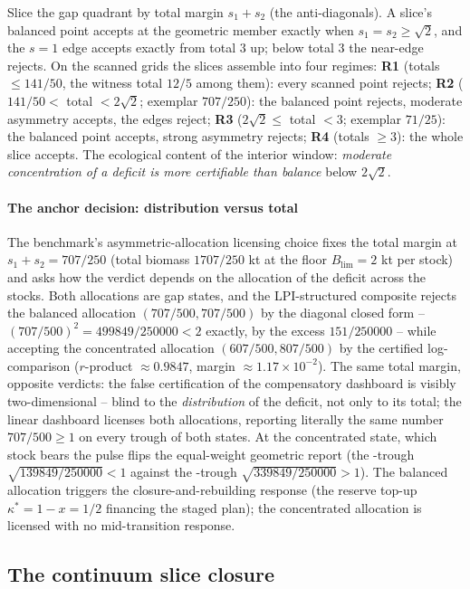 Slice the gap quadrant by total margin $s_1+s_2$ (the anti-diagonals). A slice's balanced point accepts at the geometric member exactly when $s_1=s_2\ge\sqrt2$, and the $s=1$ edge accepts exactly from total $3$ up; below total $3$ the near-edge rejects. On the scanned grids the slices assemble into four regimes: \textbf{R1} (totals $\le141/50$, the witness total $12/5$ among them): every scanned point rejects; \textbf{R2} ($141/50<$ total $<2\sqrt2$; exemplar $707/250$): the balanced point rejects, moderate asymmetry accepts, the edges reject; \textbf{R3} ($2\sqrt2\le$ total $<3$; exemplar $71/25$): the balanced point accepts, strong asymmetry rejects; \textbf{R4} (totals $\ge3$): the whole slice accepts. The ecological content of the interior window: \emph{moderate concentration of a deficit is more certifiable than balance} below $2\sqrt2$.

\paragraph{The anchor decision: distribution versus total} The benchmark's asymmetric-allocation licensing choice fixes the total margin at $s_1+s_2=707/250$ (total biomass $1707/250$ kt at the floor $B_{\mathrm{lim}}=2$ kt per stock) and asks how the verdict depends on the allocation of the deficit across the stocks. Both allocations are gap states, and the LPI-structured composite rejects the balanced allocation $(707/500,707/500)$ by the diagonal closed form -- $(707/500)^2=499849/250000<2$ exactly, by the excess $151/250000$ -- while accepting the concentrated allocation $(607/500,807/500)$ by the certified log-comparison ($r$-product $\approx0.9847$, margin $\approx1.17\times10^{-2}$). The same total margin, opposite verdicts: the false certification of the compensatory dashboard is visibly two-dimensional -- blind to the \emph{distribution} of the deficit, not only to its total; the linear dashboard licenses both allocations, reporting literally the same number $707/500\ge1$ on every trough of both states. At the concentrated state, which stock bears the pulse flips the equal-weight geometric report (the -trough $\sqrt{139849/250000}<1$ against the -trough $\sqrt{339849/250000}>1$). The balanced allocation triggers the closure-and-rebuilding response (the reserve top-up $\kappa^*=1-x=1/2$ financing the staged plan); the concentrated allocation is licensed with no mid-transition response.

\subsection{The continuum slice closure}

